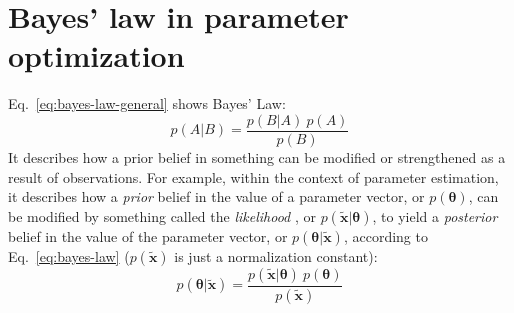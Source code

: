 \section{Bayes' law in parameter optimization}

Eq.~\ref{eq:bayes-law-general} shows Bayes' Law:
\begin{equation}\label{eq:bayes-law-general}
p(A|B) = \frac{p(B|A)\:p(A)}{p(B)}
\end{equation}
It describes how a prior belief in something can be modified or strengthened as
a result of observations. For example, within the context of parameter
estimation, it describes how a \textit{prior} belief in the value of a parameter
vector, or $p(\boldsymbol\theta)$, can be modified by something called the
\textit{likelihood} , or $p(\tilde{\mathbf{x}}|\boldsymbol\theta)$, to yield a
\textit{posterior} belief in the value of the parameter vector, or
$p(\boldsymbol\theta|\tilde{\mathbf{x}})$,  according to Eq.~\ref{eq:bayes-law}
($p(\tilde{\mathbf{x}})$ is just a normalization constant):
\begin{equation}\label{eq:bayes-law}
p(\boldsymbol\theta|\tilde{\mathbf{x}}) =
\frac{p(\tilde{\mathbf{x}}|\boldsymbol\theta)\:p(\boldsymbol\theta)}{p(\tilde{\mathbf{x}})}
\end{equation}

%
%
%
%
%
%




